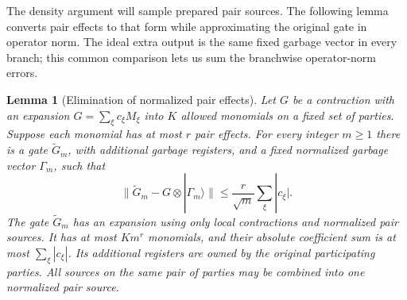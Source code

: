 \documentclass[11pt]{article}
\numberwithin{equation}{section}
\newtheorem{lemma}[theorem]{Lemma}
\theoremstyle{definition}
\theoremstyle{remark}
\newcommand{\norm}[1]{\lVert #1\rVert}
\begin{document}
The density argument will sample prepared pair sources.  The following
lemma converts pair effects to that form while approximating the original
gate in operator norm.  The ideal extra output is the same fixed garbage
vector in every branch; this common comparison lets us sum the branchwise
operator-norm errors.

\begin{lemma}[Elimination of normalized pair effects]
\label{lem:effects}
Let $G$ be a contraction with an expansion
$G=\sum_{\xi}c_{\xi}M_{\xi}$ into $K$ allowed monomials on a fixed set of
parties.  Suppose each monomial has at most $r$ pair effects.  For every
integer $m\ge1$ there is a gate $\widetilde G_m$, with additional garbage
registers, and a fixed normalized garbage vector $\Gamma_m$, such that
\begin{equation}
 \norm{\widetilde G_m-G\otimes|\Gamma_m\rangle}
 \le \frac{r}{\sqrt m}\sum_{\xi}|c_{\xi}|.
 \label{eq:compression-effect-error}
\end{equation}
The gate $\widetilde G_m$ has an expansion using only local contractions
and normalized pair sources.  It has at most $K m^r$ monomials, and their
absolute coefficient sum is at most $\sum_{\xi}|c_{\xi}|$.  Its additional
registers are owned by the original participating parties.  All sources
on the same pair of parties may be combined into one normalized pair
source.
\end{lemma}
\end{document}
